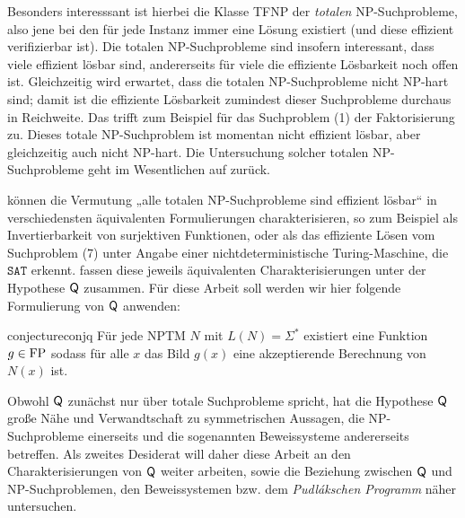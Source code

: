 
Besonders interesssant ist hierbei die Klasse TFNP der \emph{totalen} NP-Suchprobleme, also jene bei den für jede Instanz immer eine Lösung existiert (und diese effizient verifizierbar ist). Die totalen NP-Suchprobleme sind insofern interessant, dass viele effizient lösbar sind, andererseits für viele die effiziente Lösbarkeit noch offen ist. Gleichzeitig wird erwartet, dass die totalen NP-Suchprobleme nicht NP-hart sind; damit ist die effiziente Lösbarkeit zumindest dieser Suchprobleme durchaus in Reichweite. 
Das trifft zum Beispiel für das Suchproblem (1) der Faktorisierung zu. Dieses totale NP-Suchproblem ist momentan nicht effizient lösbar, aber gleichzeitig auch nicht NP-hart. Die Untersuchung solcher totalen NP-Suchprobleme geht im Wesentlichen auf \textcites{megiddo_total_1991}{johnson_how_1988} zurück.

\textcite{fenner_inverting_2003} können die Vermutung „alle totalen NP-Suchprobleme sind effizient lösbar“ in verschiedensten äquivalenten Formulierungen charakterisieren, so zum Beispiel als Invertierbarkeit von surjektiven Funktionen, oder als das effiziente Lösen vom Suchproblem (7) unter Angabe einer nichtdeterministische Turing-Maschine, die $\mathtt{SAT}$ erkennt.
\citeauthor{fenner_inverting_2003} fassen diese jeweils äquivalenten Charakterisierungen unter der Hypothese $\mathsf{Q}$ zusammen. Für diese Arbeit soll werden wir hier folgende Formulierung von  $\mathsf{Q}$ anwenden:
\begin{restatable}{conjecture}{conjq}
    Für jede NPTM $N$ mit $L(N)=\Sigma^*$ existiert eine Funktion $g\in\mathrm{FP}$ sodass für alle $x$ das Bild $g(x)$ eine akzeptierende Berechnung von $N(x)$ ist. 
\end{restatable}
Obwohl $\mathsf{Q}$ zunächst nur über totale Suchprobleme spricht, hat die Hypothese 
 $\mathsf{Q}$ große Nähe und Verwandtschaft zu symmetrischen Aussagen, die NP-Suchprobleme einerseits und die sogenannten Beweissysteme andererseits betreffen.
Als zweites Desiderat will daher diese Arbeit an den Charakterisierungen von $\mathsf{Q}$ weiter arbeiten, sowie die Beziehung zwischen $\mathsf{Q}$ und NP-Suchproblemen, den Beweissystemen \parencite[nach][]{cook_relative_1979} bzw. dem \emph{Pudlákschen Programm} \parencite*{pudlak_incompleteness_2017} näher untersuchen.


